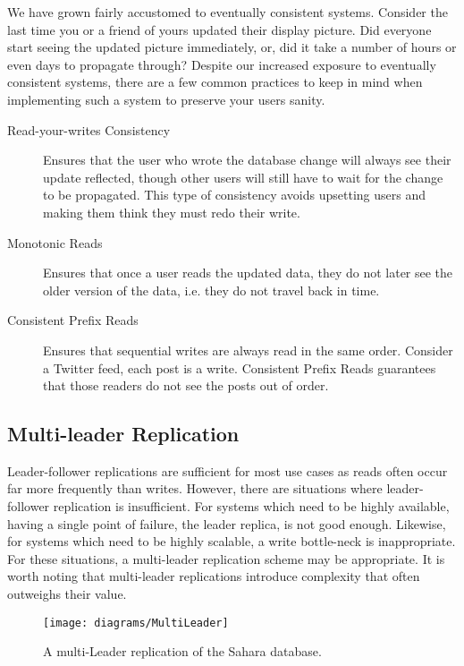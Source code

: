We have grown fairly accustomed to eventually consistent systems.
Consider the last time you or a friend of yours updated their display picture.
Did everyone start seeing the updated picture immediately, or,
did it take a number of hours or even days to propagate through?
Despite our increased exposure to eventually consistent systems,
there are a few common practices to keep in mind when implementing such a system to preserve your users sanity.

\begin{description}
    \item[Read-your-writes Consistency] Ensures that the user who wrote the database change will always see their update reflected, though other users will still have to wait for the change to be propagated. This type of consistency avoids upsetting users and making them think they must redo their write.
    \item[Monotonic Reads] Ensures that once a user reads the updated data, they do not later see the older version of the data, i.e. they do not travel back in time.
    \item[Consistent Prefix Reads] Ensures that sequential writes are always read in the same order. Consider a Twitter feed, each post is a write. Consistent Prefix Reads guarantees that those readers do not see the posts out of order.
\end{description}

\subsection{Multi-leader Replication}

Leader-follower replications are sufficient for most use cases as reads often occur far more frequently than writes.
However, there are situations where leader-follower replication is insufficient.
For systems which need to be highly available,
having a single point of failure,
the leader replica, is not good enough.
Likewise, for systems which need to be highly scalable,
a write bottle-neck is inappropriate.
For these situations, a multi-leader replication scheme may be appropriate.
It is worth noting that multi-leader replications introduce complexity that often outweighs their value.

\begin{figure}[ht]
    \begin{center}
    \texttt{[image: diagrams/MultiLeader]}
    \end{center}
    \caption{A multi-Leader replication of the Sahara database.}
    \label{fig:sahara-multi-leader}
\end{figure}

